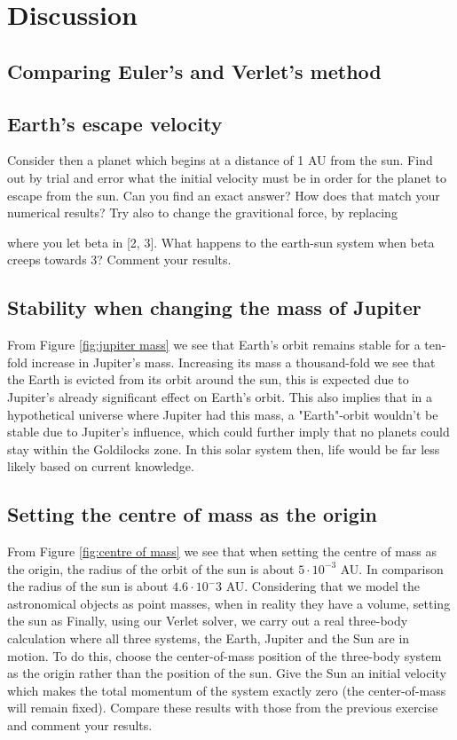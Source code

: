 \section{Discussion}
\label{sec:discussion}

\subsection{Comparing Euler's and Verlet's method}

\subsection{Earth's escape velocity}
Consider then a planet which begins at a
distance of 1 AU from the sun. Find out by trial and error what the initial
velocity must be in order for the planet to escape from the sun. Can you find an
exact answer? How does that match your numerical results?
Try also to change the gravitional force, by replacing

where you let beta in [2, 3]. What happens to the earth-sun system when beta creeps
towards 3? Comment your results.


\subsection{Stability when changing the mass of Jupiter}

From Figure \ref{fig:jupiter mass} we see that Earth's orbit remains stable for a
ten-fold increase in Jupiter's mass. Increasing its mass a thousand-fold we see
that the Earth is evicted from its orbit around the sun, this is expected due to
Jupiter's already significant effect on Earth's orbit. This also implies that in a hypothetical universe where Jupiter had this mass, a "Earth"-orbit wouldn't be stable due to Jupiter's influence, which could further imply that no planets could stay within the Goldilocks zone. In this solar system then, life would be far less likely based on current knowledge.

\subsection{Setting the centre of mass as the origin}
From Figure \ref{fig:centre of mass} we see that when setting the centre of mass as the origin, the radius of the orbit of the sun is about $5\cdot 10^{-3}$ AU. In comparison the radius of the sun is about $4.6\cdot 10^-3{}$ AU. Considering that we model the astronomical objects as point masses, when in reality they have a volume, setting the sun as
Finally,
using our Verlet solver, we carry out a real three-body calculation where all
three systems, the Earth, Jupiter and the Sun are in motion. To do this, choose
the center-of-mass position of the three-body system as the origin rather than
the position of the sun. Give the Sun an initial velocity which makes the total
momentum of the system exactly zero (the center-of-mass will remain fixed).
Compare these results with those from the previous exercise and comment your
results.

